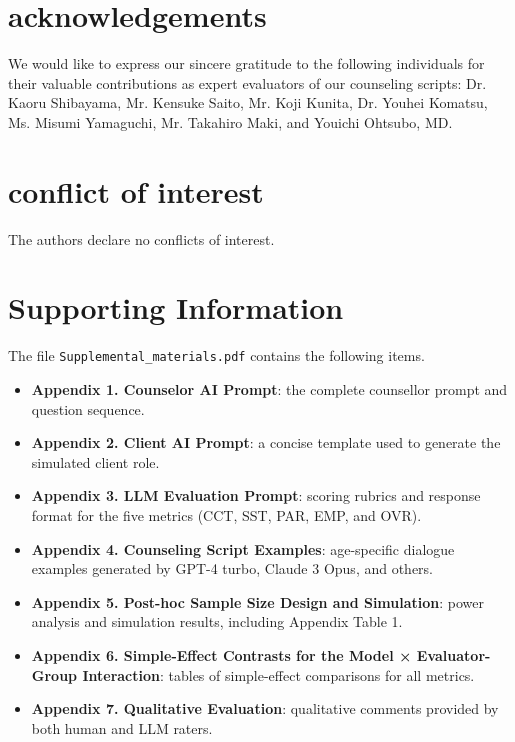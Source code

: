 \documentclass{wiley-article}
\begin{document}

\section*{acknowledgements}
We would like to express our sincere gratitude to the following individuals for their valuable contributions as expert evaluators of our counseling scripts: Dr. Kaoru Shibayama, Mr. Kensuke Saito, Mr. Koji Kunita, Dr. Youhei Komatsu, Ms. Misumi Yamaguchi, Mr. Takahiro Maki, and Youichi Ohtsubo, MD.

\section*{conflict of interest}
The authors declare no conflicts of interest.

\section*{Supporting Information}

The file \texttt{Supplemental\_materials.pdf} contains the following items.

\begin{itemize}
  \item \textbf{Appendix 1. Counselor AI Prompt}: the complete counsellor prompt and question sequence.
  \item \textbf{Appendix 2. Client AI Prompt}: a concise template used to generate the simulated client role.
  \item \textbf{Appendix 3. LLM Evaluation Prompt}: scoring rubrics and response format for the five metrics (CCT, SST, PAR, EMP, and OVR).
  \item \textbf{Appendix 4. Counseling Script Examples}: age-specific dialogue examples generated by GPT-4 turbo, Claude 3 Opus, and others.
  \item \textbf{Appendix 5. Post-hoc Sample Size Design and Simulation}: power analysis and simulation results, including Appendix Table 1.
  \item \textbf{Appendix 6. Simple-Effect Contrasts for the Model × Evaluator-Group Interaction}: tables of simple-effect comparisons for all metrics.
  \item \textbf{Appendix 7. Qualitative Evaluation}: qualitative comments provided by both human and LLM raters.
\end{itemize}

\end{document}
